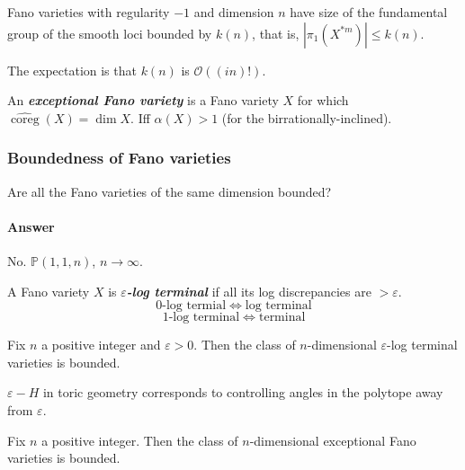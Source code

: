 \begin{coro}
	Fano varieties with regularity $-1$ and dimension $n$ have size of the fundamental group of the smooth loci bounded by $k(n)$, that is,  $|\pi_{1}(X^{*m}) |\leq k(n)$.
\end{coro}

\begin{remark}
	The expectation is that $k(n)$ is $\mathcal{O}((in)!)$.
\end{remark}

\begin{defn}
	An \textit{\textbf{exceptional Fano variety}} is a Fano variety $X$ for which $\hat{\operatorname{coreg}}(X)=\dim X$. Iff $\alpha(X)>1$ (for the birrationally-inclined).
\end{defn}

\subsubsection{Boundedness of Fano varieties}

\begin{question}
	Are all the Fano varieties of the same dimension bounded?
\end{question}

\paragraph{Answer} No. $\mathbb{P}(1,1,n)$, $n\to \infty$.

\begin{defn}
	A Fano variety $X$ is \textit{\textbf{$\varepsilon $-log terminal}} if all its log discrepancies are $>\varepsilon $.
	\[0\text{-log termial} \iff\text{log terminal} \]
	\[1\text{-log terminal} \iff\text{terminal} \]
\end{defn}

\begin{thm}\leavevmode
	Fix $n$ a positive integer and $\varepsilon >0$. Then the class of $n$-dimensional $\varepsilon $-log terminal varieties is bounded.

	$\varepsilon -H$ in toric geometry corresponds to controlling angles in the polytope away from $\varepsilon $.
\end{thm}

\begin{thm}\leavevmode
	Fix $n$ a positive integer. Then the class of $n$-dimensional exceptional Fano varieties is bounded.
\end{thm}


